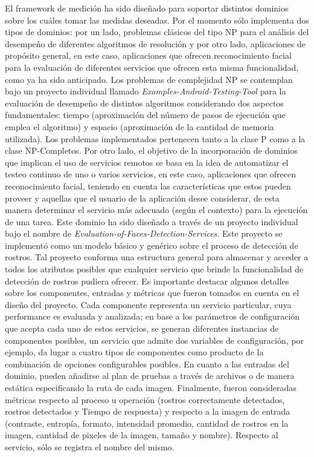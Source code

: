 El framework de medición ha sido diseñado para soportar distintos
dominios sobre los cuáles tomar las medidas deseadas. Por el momento
sólo implementa dos tipos de dominios: por un lado, problemas clásicos
del tipo NP para el análisis del desempeño de diferentes algoritmos
de resolución y por otro lado, aplicaciones de propósito general,
en este caso, aplicaciones que ofrecen reconocimiento facial para
la evaluación de diferentes servicios que ofrecen esta misma funcionalidad,
como ya ha sido anticipado. Los problemas de complejidad NP se contemplan
bajo un proyecto individual llamado \emph{Examples-Android-Testing-Tool}
para la evaluación de desempeño de distintos algoritmos considerando
dos aspectos fundamentales: tiempo (aproximación del número de pasos
de ejecución que emplea el algoritmo) y espacio (aproximación de la
cantidad de memoria utilizada). Los problemas implementados pertenecen
tanto a la clase P como a la clase NP-Completos. Por otro lado, el
objetivo de la incorporación de dominios que implican el uso de servicios
remotos se basa en la idea de automatizar el testeo continuo de uno
o varios servicios, en este caso, aplicaciones que ofrecen reconocimiento
facial, teniendo en cuenta las características que estos pueden proveer
y aquellas que el usuario de la aplicación desee considerar, de esta
manera determinar el servicio más adecuado (según el contexto) para
la ejecución de una tarea. Este dominio ha sido diseñado a través
de un proyecto individual bajo el nombre de \emph{Evaluation-of-Faces-Detection-Services}.
Este proyecto se implementó como un modelo básico y genérico sobre
el proceso de detección de rostros. Tal proyecto conforma una estructura
general para almacenar y acceder a todos los atributos posibles que
cualquier servicio que brinde la funcionalidad de detección de rostros
pudiera ofrecer. Es importante destacar algunos detalles sobre los
componentes, entradas y métricas que fueron tomados en cuenta en el
diseño del proyecto. Cada componente representa un servicio particular,
cuya performance es evaluada y analizada; en base a los parámetros
de configuración que acepta cada uno de estos servicios, se generan
diferentes instancias de componentes posibles, un servicio que admite
dos variables de configuración, por ejemplo, da lugar a cuatro tipos
de componentes como producto de la combinación de opciones configurables
posibles. En cuanto a las entradas del dominio, pueden añadirse al
plan de pruebas a través de archivos o de manera estática especificando
la ruta de cada imagen. Finalmente, fueron consideradas métricas respecto
al proceso u operación (rostros correctamente detectados, rostros
detectados y Tiempo de respuesta) y respecto a la imagen de entrada
(contraste, entropía, formato, intensidad promedio, cantidad de rostros
en la imagen, cantidad de pixeles de la imagen, tamaño y nombre).
Respecto al servicio, sólo se registra el nombre del mismo. 


